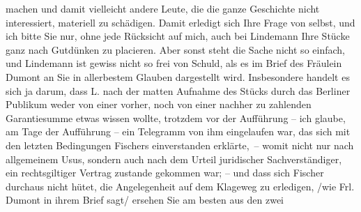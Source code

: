 \begin{ledgroupsized}[t]{13cm}
               machen und damit vielleicht  andere Leute, die
               die ganze Geschichte nicht interessiert, materiell zu schädigen. Damit erledigt sich
               Ihre Frage von selbst, und ich bit{\pb}te Sie nur, ohne jede
               Rücksicht auf mich, auch bei Lindemann Ihre
               Stücke ganz nach Gutdünken zu placieren.\pend
           \pstart
           Aber sonst steht die Sache nicht so einfach, und Lindemann ist gewiss nicht so frei von Schuld, als es im Brief des Fräulein
                  Dumont an Sie in allerbestem Glauben
               dargestellt wird.\pend
           \pstart
           Insbesondere handelt es sich ja darum, dass L.
               nach der matten Aufnahme des Stücks durch das Berliner Publikum weder
               von einer vorher, noch von einer nachher zu zahlenden Garantiesumme etwas wissen
               wollte, trotzdem vor der Aufführung – ich glaube, am Tage der Aufführung – ein
               Telegramm \introOben{}von ihm\introOben{} eingelaufen war, das sich mit den letzten
               Bedingungen Fischers einverstanden erklärte, –
               womit nicht nur nach allgemeinem Usus, sondern auch nach dem Urteil juridischer
               Sachverständiger, ein rechtsgiltiger Vertrag zustande gekommen war; \introOben{}–\introOben{} und dass sich Fischer durchaus nicht hütet, die Angelegenheit auf dem Klageweg zu
                  erledi{\pb}gen, /wie Frl. Dumont in ihrem Brief sagt/ ersehen Sie am besten aus den zwei

\end{ledgroupsized}
